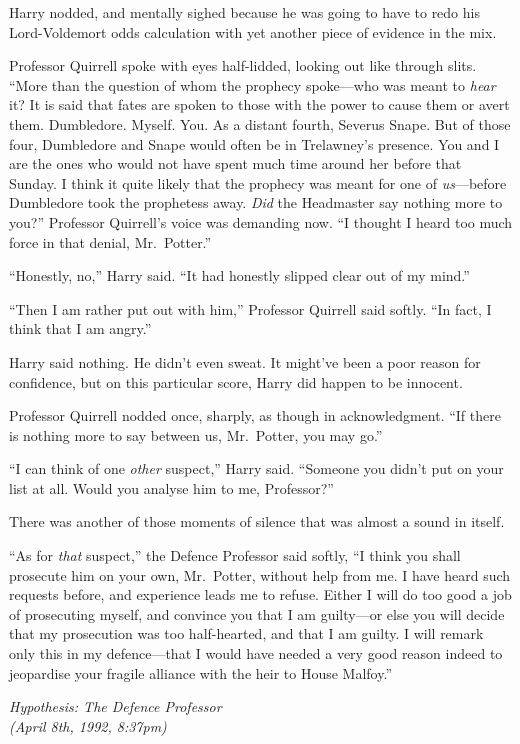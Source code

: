 Harry nodded, and mentally sighed because he was going to have to redo
his Lord-Voldemort odds calculation with yet another piece of evidence
in the mix.

Professor Quirrell spoke with eyes half-lidded, looking out like through
slits. ``More than the question of whom the prophecy spoke---who was
meant to \emph{hear} it? It is said that fates are spoken to those with
the power to cause them or avert them. Dumbledore. Myself. You. As a
distant fourth, Severus Snape. But of those four, Dumbledore and Snape
would often be in Trelawney's presence. You and I are the ones who would
not have spent much time around her before that Sunday. I think it quite
likely that the prophecy was meant for one of \emph{us}---before
Dumbledore took the prophetess away. \emph{Did} the Headmaster say
nothing more to you?'' Professor Quirrell's voice was demanding now. ``I
thought I heard too much force in that denial, Mr.~Potter.''

``Honestly, no,'' Harry said. ``It had honestly slipped clear out of my
mind.''

``Then I am rather put out with him,'' Professor Quirrell said softly.
``In fact, I think that I am angry.''

Harry said nothing. He didn't even sweat. It might've been a poor reason
for confidence, but on this particular score, Harry did happen to be
innocent.

Professor Quirrell nodded once, sharply, as though in acknowledgment.
``If there is nothing more to say between us, Mr.~Potter, you may go.''

``I can think of one \emph{other} suspect,'' Harry said. ``Someone you
didn't put on your list at all. Would you analyse him to me,
Professor?''

There was another of those moments of silence that was almost a sound in
itself.

``As for \emph{that} suspect,'' the Defence Professor said softly, ``I
think you shall prosecute him on your own, Mr.~Potter, without help from
me. I have heard such requests before, and experience leads me to
refuse. Either I will do too good a job of prosecuting myself, and
convince you that I am guilty---or else you will decide that my
prosecution was too half-hearted, and that I am guilty. I will remark
only this in my defence---that I would have needed a very good reason
indeed to jeopardise your fragile alliance with the heir to House
Malfoy.''

\emph{Hypothesis: The Defence Professor}\\\emph{(April 8th, 1992,
8:37pm)}

